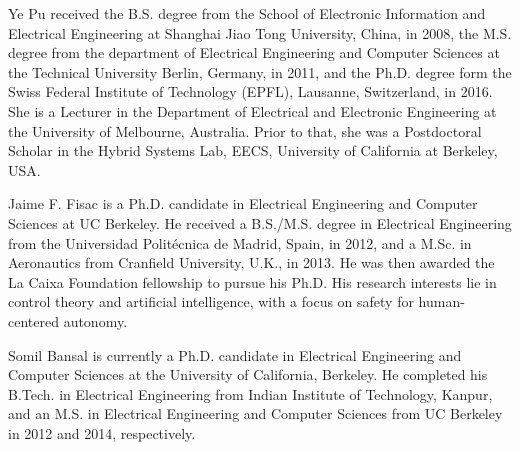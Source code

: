 \documentclass[journal]{IEEEtran}
\begin{document}
\begin{IEEEbiography}{Ye Pu}
	received the B.S. degree from the School of Electronic Information and Electrical Engineering at Shanghai Jiao Tong University, China, in 2008, the M.S. degree from the department of Electrical Engineering and Computer Sciences at the Technical University Berlin, Germany, in 2011, and the Ph.D. degree form the Swiss Federal Institute of Technology (EPFL), Lausanne, Switzerland, in 2016. She is a Lecturer in the Department of Electrical and Electronic Engineering at the University of Melbourne, Australia. Prior to that, she was a Postdoctoral Scholar in the Hybrid Systems Lab, EECS, University of California at Berkeley, USA.\vspace{-1cm}
\end{IEEEbiography}
\begin{IEEEbiography}{Jaime F. Fisac}
	is a Ph.D. candidate in Electrical Engineering and Computer Sciences at UC Berkeley. He received a B.S./M.S. degree in Electrical Engineering from the Universidad Politécnica de Madrid, Spain, in 2012, and a M.Sc. in Aeronautics from Cranfield University, U.K., in 2013. He was then awarded the La Caixa Foundation fellowship to pursue his Ph.D. His research interests lie in control theory and artificial intelligence, with a focus on safety for human-centered autonomy.\vspace{-1cm}
\end{IEEEbiography}
\begin{IEEEbiography}{Somil Bansal}
	is currently a Ph.D. candidate in Electrical Engineering and Computer Sciences at the University of California, Berkeley. He completed his B.Tech. in Electrical Engineering from Indian Institute of Technology, Kanpur, and an M.S. in  Electrical Engineering and Computer Sciences from UC Berkeley in 2012 and 2014, respectively.\vspace{-1cm}
\end{IEEEbiography}
\end{document}
